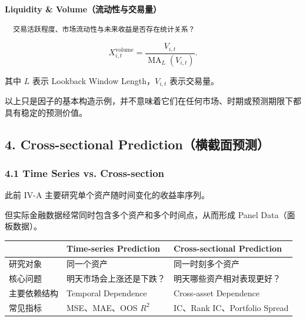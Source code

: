 
\textbf{Liquidity \& Volume（流动性与交易量）}

\begin{verbatim}
  交易活跃程度、市场流动性与未来收益是否存在统计关系？
\end{verbatim}

\[X_{i,t}^{\mathrm{volume}}
      =
      \frac{V_{i,t}}{\operatorname{MA}_L(V_{i,t})}.\]

其中 \(L\) 表示 Lookback Window Length，\(V_{i,t}\) 表示交易量。

以上只是因子的基本构造示例，并不意味着它们在任何市场、时期或预测期限下都具有稳定的预测价值。

\hypertarget{part-4-63-0001-cross-sectional-predictionux6a2aux622aux9762ux9884ux6d4b}{%
\subsection{4. Cross-sectional Prediction（横截面预测）}\label{part-4-63-0001-cross-sectional-predictionux6a2aux622aux9762ux9884ux6d4b}}

\hypertarget{part-4-63-0001-time-series-vs.-cross-section}{%
\subsubsection{4.1 Time Series vs. Cross-section}\label{part-4-63-0001-time-series-vs.-cross-section}}

此前 IV-A 主要研究单个资产随时间变化的收益率序列。

但实际金融数据经常同时包含多个资产和多个时间点，从而形成 Panel Data（面板数据）。


\begin{readertable}
\begin{longtable}[]{@{}
  >{\raggedright\arraybackslash}p{}
  >{\raggedright\arraybackslash}p{}
  >{\raggedright\arraybackslash}p{}@{}}
\toprule
& Time-series Prediction & Cross-sectional Prediction \\
\midrule
\endhead
研究对象 & 同一个资产 & 同一时刻多个资产 \\
核心问题 & 明天市场会上涨还是下跌？ & 明天哪些资产相对表现更好？ \\
主要依赖结构 & Temporal Dependence & Cross-asset Dependence \\
常见指标 & MSE、MAE、OOS \(R^2\) & IC、Rank IC、Portfolio Spread \\
\bottomrule
\end{longtable}
\end{readertable}

